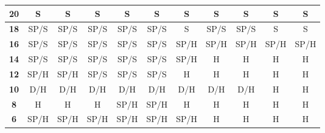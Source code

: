 \documentclass[conference]{IEEEtran}
\begin{document}
\begin{table}[htbp]
\begin{tabular}{|c|c|c|c|c|c|c|c|c|c|c|}
\textbf{20} & \cellcolor[HTML]{32CB00}S & \cellcolor[HTML]{32CB00}S & \cellcolor[HTML]{32CB00}S & \cellcolor[HTML]{32CB00}S & \cellcolor[HTML]{32CB00}S & \cellcolor[HTML]{32CB00}S & \cellcolor[HTML]{32CB00}S & \cellcolor[HTML]{32CB00}S & \cellcolor[HTML]{32CB00}S & \cellcolor[HTML]{32CB00}S \\ \hline
\textbf{18} & \cellcolor[HTML]{F8FF00}SP/S & \cellcolor[HTML]{F8FF00}SP/S & \cellcolor[HTML]{F8FF00}SP/S & \cellcolor[HTML]{F8FF00}SP/S & \cellcolor[HTML]{F8FF00}SP/S & \cellcolor[HTML]{32CB00}S & \cellcolor[HTML]{F8FF00}SP/S & \cellcolor[HTML]{F8FF00}SP/S & \cellcolor[HTML]{32CB00}S & \cellcolor[HTML]{32CB00}S \\ \hline
\textbf{16} & \cellcolor[HTML]{F8FF00}SP/S & \cellcolor[HTML]{F8FF00}SP/S & \cellcolor[HTML]{F8FF00}SP/S & \cellcolor[HTML]{F8FF00}SP/S & \cellcolor[HTML]{F8FF00}SP/S & \cellcolor[HTML]{F8FF00}SP/H & \cellcolor[HTML]{F8FF00}SP/H & \cellcolor[HTML]{F8FF00}SP/H & \cellcolor[HTML]{F8FF00}SP/H & \cellcolor[HTML]{F8FF00}SP/H \\ \hline
\textbf{14} & \cellcolor[HTML]{F8FF00}SP/S & \cellcolor[HTML]{F8FF00}SP/S & \cellcolor[HTML]{F8FF00}SP/S & \cellcolor[HTML]{F8FF00}SP/S & \cellcolor[HTML]{F8FF00}SP/S & \cellcolor[HTML]{F8FF00}SP/H & \cellcolor[HTML]{FE0000}H & \cellcolor[HTML]{FE0000}H & \cellcolor[HTML]{FE0000}H & \cellcolor[HTML]{FE0000}H \\ \hline
\textbf{12} & \cellcolor[HTML]{F8FF00}SP/H & \cellcolor[HTML]{F8FF00}SP/H & \cellcolor[HTML]{F8FF00}SP/S & \cellcolor[HTML]{F8FF00}SP/S & \cellcolor[HTML]{F8FF00}SP/S & \cellcolor[HTML]{FE0000}H & \cellcolor[HTML]{FE0000}H & \cellcolor[HTML]{FE0000}H & \cellcolor[HTML]{FE0000}H & \cellcolor[HTML]{FE0000}H \\ \hline
\textbf{10} & \cellcolor[HTML]{FFC702}D/H & \cellcolor[HTML]{FFC702}D/H & \cellcolor[HTML]{FFC702}D/H & \cellcolor[HTML]{FFC702}D/H & \cellcolor[HTML]{FFC702}D/H & \cellcolor[HTML]{FFC702}D/H & \cellcolor[HTML]{FFC702}D/H & \cellcolor[HTML]{FFC702}D/H & \cellcolor[HTML]{FE0000}H & \cellcolor[HTML]{FE0000}H \\ \hline
\textbf{8} & \cellcolor[HTML]{FE0000}H & \cellcolor[HTML]{FE0000}H & \cellcolor[HTML]{FE0000}H & \cellcolor[HTML]{F8FF00}SP/H & \cellcolor[HTML]{F8FF00}SP/H & \cellcolor[HTML]{FE0000}H & \cellcolor[HTML]{FE0000}H & \cellcolor[HTML]{FE0000}H & \cellcolor[HTML]{FE0000}H & \cellcolor[HTML]{FE0000}H \\ \hline
\textbf{6} & \cellcolor[HTML]{F8FF00}SP/H & \cellcolor[HTML]{F8FF00}SP/H & \cellcolor[HTML]{F8FF00}SP/H & \cellcolor[HTML]{F8FF00}SP/H & \cellcolor[HTML]{F8FF00}SP/H & \cellcolor[HTML]{F8FF00}SP/H & \cellcolor[HTML]{FE0000}H & \cellcolor[HTML]{FE0000}H & \cellcolor[HTML]{FE0000}H & \cellcolor[HTML]{FE0000}H \\ \hline

\end{tabular}
\end{table}
\end{document}
